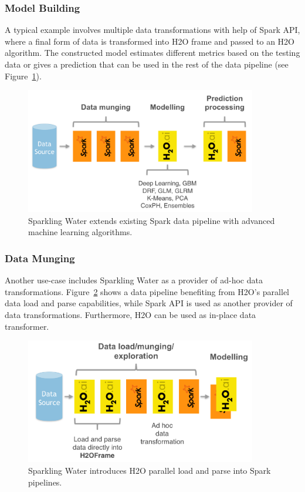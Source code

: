 \documentclass{standalone}
\begin{document}
\subsubsection{Model Building}
A typical example involves multiple data transformations with help of Spark API, where a final form of data is transformed into H2O frame and passed to an H2O algorithm. The constructed model estimates different metrics based on the testing data or gives a prediction that can be used in the rest of the data pipeline (see Figure~\ref{fig:uc1}).
\begin{figure}[h!]
	\centering
	\includegraphics[width=0.9\textwidth]{sw/images/uc1.png}
	\caption{Sparkling Water extends existing Spark data pipeline with advanced machine learning algorithms.}
	\label{fig:uc1} 
\end{figure}

\subsubsection{Data Munging}
Another use-case includes Sparkling Water as a provider of ad-hoc data transformations. Figure~\ref{fig:uc2} shows a data pipeline benefiting from H2O's parallel data load and parse capabilities, while Spark API is used as another provider of data transformations. Furthermore, H2O can be used as in-place data transformer.

\begin{figure}[h!]
	\centering
	\includegraphics[width=0.9\textwidth]{sw/images/uc2.png}
	\caption{Sparkling Water introduces H2O parallel load and parse into Spark pipelines.}
	\label{fig:uc2} 
\end{figure}
\end{document}
